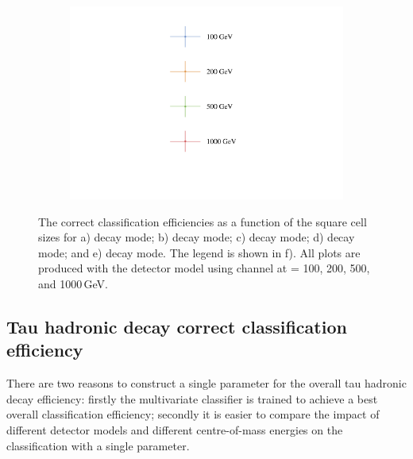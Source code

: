 \begin{figure}[htbp]
\begin{subfigure}[b]{0.45\textwidth}
  \caption{}
  \label{fig:tauDecayMode6}
\end{subfigure}
\begin{subfigure}[b]{0.45\textwidth}
  \includegraphics[width=\textwidth]{tau/plots3/legend.pdf}
  \caption{}
  \label{fig:tauDecayLegend}
\end{subfigure}
\caption[The correct classification efficiency for  tau hadronic decay final states  as a function of the \ECAL square cell sizes]
{ The correct classification efficiencies as a function of the \ECAL square cell sizes for a) \decayPionShort decay mode; b) \decayRhoShortest decay mode; c) \decayAiPhotonShortest decay mode; d) \decayAiPionShortest decay mode; and e) \decayThreePionPhotonShort decay mode. The legend is shown in f). All plots are produced with  the \ILD detector model using \eeTauTau channel at \sqrtS = 100, 200, 500, and 1000\,GeV.}
\label{fig:TauPionEfficiency}
\end{figure}


\subsection{Tau hadronic decay correct classification efficiency}

There are two reasons to construct a single parameter for  the overall tau hadronic decay efficiency: firstly the multivariate classifier is trained to achieve a best overall classification efficiency; secondly it is easier to compare the impact of different detector models and different centre-of-mass energies on the classification with a single parameter.

